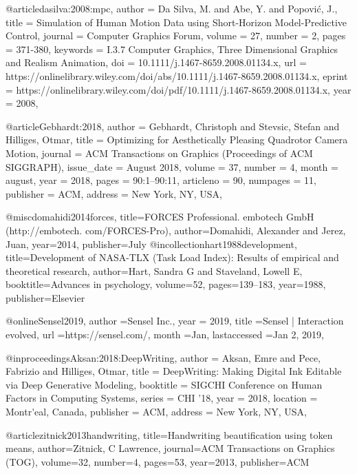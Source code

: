 @article{dasilva:2008:mpc,
author = {Da Silva, M. and Abe, Y. and Popović, J.},
title = {Simulation of Human Motion Data using Short-Horizon Model-Predictive Control},
journal = {Computer Graphics Forum},
volume = {27},
number = {2},
pages = {371-380},
keywords = {I.3.7 Computer Graphics, Three Dimensional Graphics and Realism Animation},
doi = {10.1111/j.1467-8659.2008.01134.x},
url = {https://onlinelibrary.wiley.com/doi/abs/10.1111/j.1467-8659.2008.01134.x},
eprint = {https://onlinelibrary.wiley.com/doi/pdf/10.1111/j.1467-8659.2008.01134.x},
year = {2008},
}

@article{Gebhardt:2018,
	author = {Gebhardt, Christoph and Stevsic, Stefan and Hilliges, Otmar},
	title = {{Optimizing for Aesthetically Pleasing Quadrotor Camera Motion}},
	journal = {ACM Transactions on Graphics (Proceedings of ACM SIGGRAPH)},
	issue_date = {August 2018},
	volume = {37},
	number = {4},
	month = august,
	year = {2018},
	pages = {90:1--90:11},
	articleno = {90},
	numpages = {11},
	publisher = {ACM},
	address = {New York, NY, USA},
}

@misc{domahidi2014forces,
  title={FORCES Professional. embotech GmbH (http://embotech. com/FORCES-Pro)},
  author={Domahidi, Alexander and Jerez, Juan},
  year={2014},
  publisher={July}
}
@incollection{hart1988development,
  title={Development of NASA-TLX (Task Load Index): Results of empirical and theoretical research},
  author={Hart, Sandra G and Staveland, Lowell E},
  booktitle={Advances in psychology},
  volume={52},
  pages={139--183},
  year={1988},
  publisher={Elsevier}
}

@online{Sensel2019,
author ={{Sensel Inc.}},
year = {2019},
title ={Sensel | Interaction evolved},
url ={https://sensel.com/},
month ={Jan},
lastaccessed ={Jan 2, 2019},
}

@inproceedings{Aksan:2018:DeepWriting,
  author = {Aksan, Emre and Pece, Fabrizio and Hilliges, Otmar},
  title = {{DeepWriting: Making Digital Ink Editable via Deep Generative Modeling}},
  booktitle = {SIGCHI Conference on Human Factors in Computing Systems},
  series = {CHI '18},
  year = {2018},
  location = {Montr{\'}eal, Canada},
  publisher = {ACM},
  address = {New York, NY, USA},
}

@article{zitnick2013handwriting,
  title={Handwriting beautification using token means},
  author={Zitnick, C Lawrence},
  journal={ACM Transactions on Graphics (TOG)},
  volume={32},
  number={4},
  pages={53},
  year={2013},
  publisher={ACM}
}



